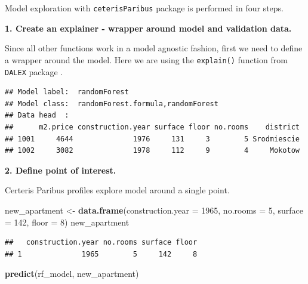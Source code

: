 \documentclass[]{book}
\newenvironment{Shaded}{\begin{snugshade}}{\end{snugshade}}
\newcommand{\DataTypeTok}[1]{\textcolor[rgb]{0.13,0.29,0.53}{#1}}
\newcommand{\DecValTok}[1]{\textcolor[rgb]{0.00,0.00,0.81}{#1}}
\newcommand{\KeywordTok}[1]{\textcolor[rgb]{0.13,0.29,0.53}{\textbf{#1}}}
\newcommand{\NormalTok}[1]{#1}
\newcommand{\OperatorTok}[1]{\textcolor[rgb]{0.81,0.36,0.00}{\textbf{#1}}}
\newcommand{\StringTok}[1]{\textcolor[rgb]{0.31,0.60,0.02}{#1}}
\theoremstyle{definition}
\theoremstyle{definition}
\theoremstyle{definition}
\theoremstyle{remark}
\begin{document}
Model exploration with \texttt{ceterisParibus} package is performed in
four steps.

\textbf{1. Create an explainer - wrapper around model and validation
data.}

Since all other functions work in a model agnostic fashion, first we
need to define a wrapper around the model. Here we are using the
\texttt{explain()} function from \texttt{DALEX} package \citep{R-DALEX}.

\begin{Shaded}
\end{Shaded}

\begin{verbatim}
## Model label:  randomForest 
## Model class:  randomForest.formula,randomForest 
## Data head  :
##      m2.price construction.year surface floor no.rooms    district
## 1001     4644              1976     131     3        5 Srodmiescie
## 1002     3082              1978     112     9        4     Mokotow
\end{verbatim}

\textbf{2. Define point of interest.}

Certeris Paribus profiles explore model around a single point.

\begin{Shaded}
\begin{Highlighting}[]
\NormalTok{new_apartment <-}\StringTok{ }\KeywordTok{data.frame}\NormalTok{(}\DataTypeTok{construction.year =} \DecValTok{1965}\NormalTok{, }\DataTypeTok{no.rooms =} \DecValTok{5}\NormalTok{, }\DataTypeTok{surface =} \DecValTok{142}\NormalTok{, }\DataTypeTok{floor =} \DecValTok{8}\NormalTok{)}
\NormalTok{new_apartment}
\end{Highlighting}
\end{Shaded}

\begin{verbatim}
##   construction.year no.rooms surface floor
## 1              1965        5     142     8
\end{verbatim}

\begin{Shaded}
\begin{Highlighting}[]
\KeywordTok{predict}\NormalTok{(rf_model, new_apartment)}
\end{Highlighting}
\end{Shaded}
\end{document}
